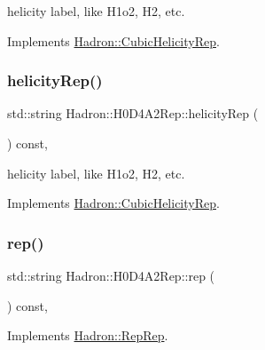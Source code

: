 helicity label, like H1o2, H2, etc. 

Implements \mbox{\hyperlink{structHadron_1_1CubicHelicityRep_af1096946b7470edf0a55451cc662f231}{Hadron\+::\+Cubic\+Helicity\+Rep}}.

\mbox{\label{structHadron_1_1H0D4A2Rep_a4998188757fbc152763b632ab09afbcf}} 
\subsubsection{\texorpdfstring{helicityRep()}{helicityRep()}\hspace{0.1cm}{\footnotesize\ttfamily [2/2]}}
{\footnotesize\ttfamily std\+::string Hadron\+::\+H0\+D4\+A2\+Rep\+::helicity\+Rep (\begin{DoxyParamCaption}{ }\end{DoxyParamCaption}) const\hspace{0.3cm}{\ttfamily [inline]}, {\ttfamily [virtual]}}

helicity label, like H1o2, H2, etc. 

Implements \mbox{\hyperlink{structHadron_1_1CubicHelicityRep_af1096946b7470edf0a55451cc662f231}{Hadron\+::\+Cubic\+Helicity\+Rep}}.

\mbox{\label{structHadron_1_1H0D4A2Rep_ad23c66fe369200d0ff8bebcabf8dfc62}} 
\subsubsection{\texorpdfstring{rep()}{rep()}\hspace{0.1cm}{\footnotesize\ttfamily [1/3]}}
{\footnotesize\ttfamily std\+::string Hadron\+::\+H0\+D4\+A2\+Rep\+::rep (\begin{DoxyParamCaption}{ }\end{DoxyParamCaption}) const\hspace{0.3cm}{\ttfamily [inline]}, {\ttfamily [virtual]}}



Implements \mbox{\hyperlink{structHadron_1_1RepRep_ab3213025f6de249f7095892109575fde}{Hadron\+::\+Rep\+Rep}}.

\mbox{\label{structHadron_1_1H0D4A2Rep_ad23c66fe369200d0ff8bebcabf8dfc62}} 
